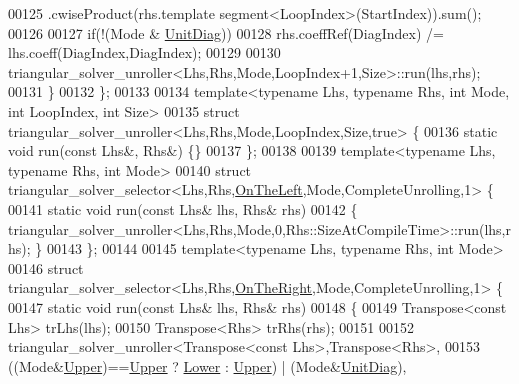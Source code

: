 \begin{DoxyCode}
00125                                 .cwiseProduct(rhs.template segment<LoopIndex>(StartIndex)).sum();
00126 
00127     \textcolor{keywordflow}{if}(!(Mode & \hyperlink{group__enums_gga39e3366ff5554d731e7dc8bb642f83cdaddb72f888ac85d5a1c52333e54f9374b}{UnitDiag}))
00128       rhs.coeffRef(DiagIndex) /= lhs.coeff(DiagIndex,DiagIndex);
00129 
00130     triangular\_solver\_unroller<Lhs,Rhs,Mode,LoopIndex+1,Size>::run(lhs,rhs);
00131   \}
00132 \};
00133 
00134 \textcolor{keyword}{template}<\textcolor{keyword}{typename} Lhs, \textcolor{keyword}{typename} Rhs, \textcolor{keywordtype}{int} Mode, \textcolor{keywordtype}{int} LoopIndex, \textcolor{keywordtype}{int} Size>
00135 \textcolor{keyword}{struct }triangular\_solver\_unroller<Lhs,Rhs,Mode,LoopIndex,Size,true> \{
00136   \textcolor{keyword}{static} \textcolor{keywordtype}{void} run(\textcolor{keyword}{const} Lhs&, Rhs&) \{\}
00137 \};
00138 
00139 \textcolor{keyword}{template}<\textcolor{keyword}{typename} Lhs, \textcolor{keyword}{typename} Rhs, \textcolor{keywordtype}{int} Mode>
00140 \textcolor{keyword}{struct }triangular\_solver\_selector<Lhs,Rhs,\hyperlink{group__enums_ggac22de43beeac7a78b384f99bed5cee0ba129609b3bdf23b071f5f86cf2f995ec4}{OnTheLeft},Mode,CompleteUnrolling,1> \{
00141   \textcolor{keyword}{static} \textcolor{keywordtype}{void} run(\textcolor{keyword}{const} Lhs& lhs, Rhs& rhs)
00142   \{ triangular\_solver\_unroller<Lhs,Rhs,Mode,0,Rhs::SizeAtCompileTime>::run(lhs,rhs); \}
00143 \};
00144 
00145 \textcolor{keyword}{template}<\textcolor{keyword}{typename} Lhs, \textcolor{keyword}{typename} Rhs, \textcolor{keywordtype}{int} Mode>
00146 \textcolor{keyword}{struct }triangular\_solver\_selector<Lhs,Rhs,\hyperlink{group__enums_ggac22de43beeac7a78b384f99bed5cee0ba99dc75d8e00b6c3a5bdc31940f47492b}{OnTheRight},Mode,CompleteUnrolling,1> \{
00147   \textcolor{keyword}{static} \textcolor{keywordtype}{void} run(\textcolor{keyword}{const} Lhs& lhs, Rhs& rhs)
00148   \{
00149     Transpose<const Lhs> trLhs(lhs);
00150     Transpose<Rhs> trRhs(rhs);
00151     
00152     triangular\_solver\_unroller<Transpose<const Lhs>,Transpose<Rhs>,
00153                               ((Mode&\hyperlink{group__enums_gga39e3366ff5554d731e7dc8bb642f83cda6bcb58be3b8b8ec84859ce0c5ac0aaec}{Upper})==\hyperlink{group__enums_gga39e3366ff5554d731e7dc8bb642f83cda6bcb58be3b8b8ec84859ce0c5ac0aaec}{Upper} ? \hyperlink{group__enums_gga39e3366ff5554d731e7dc8bb642f83cda891792b8ed394f7607ab16dd716f60e6}{Lower} : 
      \hyperlink{group__enums_gga39e3366ff5554d731e7dc8bb642f83cda6bcb58be3b8b8ec84859ce0c5ac0aaec}{Upper}) | (Mode&\hyperlink{group__enums_gga39e3366ff5554d731e7dc8bb642f83cdaddb72f888ac85d5a1c52333e54f9374b}{UnitDiag}),

\end{DoxyCode}
